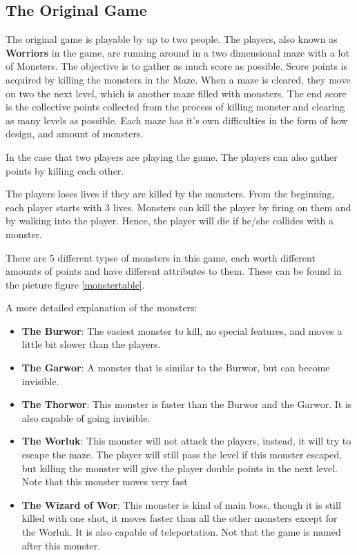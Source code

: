 \documentclass{article}
\begin{document}
  \subsection{The Original Game}

  The original game is playable by up to two people. The players, also known as \textbf{Worriors} in the game, are running around in a two dimensional maze with a lot of Monsters. The objective is to gather as much score as possible. Score points is acquired by killing the monsters in the Maze. When a maze is cleared, they move on two the next level, which is another maze filled with monsters. The end score is the collective points collected from the process of killing monster and clearing as many levels as possible. Each maze has it's own difficulties in the form of how design, and amount of monsters.

  In the case that two players are playing the game. The players can also gather points by killing each other.

  The players loses lives if they are killed by the monsters. From the beginning, each player starts with 3 lives. Monsters can kill the player by firing on them and by walking into the player. Hence, the player will die if he/she collides with a monster.

  There are 5 different typse of monsters in this game, each worth different amounts of points and have different attributes to them. These can be found in the picture figure \ref{monstertable}.

  A more detailed explanation of the monsters:
  \begin{itemize}
    \item \textbf{The Burwor}: The easiest monster to kill, no special features, and moves a little bit slower than the players.
    \item \textbf{The Garwor}: A monster that is similar to the Burwor, but can become invisible.
    \item \textbf{The Thorwor}: This monster is faster than the Burwor and the Garwor. It is also capable of going invisible.
    \item \textbf{The Worluk}: This monster will not attack the players, instead, it will try to escape the maze. The player will still pass the level if this monster escaped, but killing the monster will give the player double points in the next level. Note that this monster moves very fast
    \item \textbf{The Wizard of Wor}: This monster is kind of main boss, though it is still killed with one shot, it moves faster than all the other monsters except for the Worluk. It is also capable of teleportation. Not that the game is named after this monster.
  \end{itemize}
\end{document}
